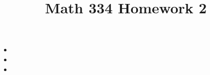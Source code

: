 \documentclass{article}
\title{Math 334 Homework 2}
\begin{document}
\maketitle
\begin{itemize}[label=]
	\item 
	\item 
	\item 
\end{itemize}
\end{document}
